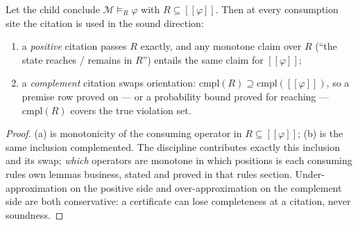 \begin{bprop}\label{prop:tc-consume}
Let the child conclude $\mathcal{M} \vDash_R \varphi$ with
$R \subseteq [\![\varphi]\!]$. Then at every consumption site the
citation is used in the sound direction:
\begin{enumerate}
\item[(a)] a \emph{positive} citation passes $R$ exactly, and any
  monotone claim over $R$ (``the state reaches / remains in $R$'')
  entails the same claim for $[\![\varphi]\!]$;
\item[(b)] a \emph{complement} citation swaps orientation:
  $\mathrm{cmpl}(R) \supseteq \mathrm{cmpl}([\![\varphi]\!])$, so a
  premise row proved on --- or a probability bound proved for reaching
  --- $\mathrm{cmpl}(R)$ covers the true violation set.
\end{enumerate}
\end{bprop}
\begin{proof}
(a) is monotonicity of the consuming operator in
$R \subseteq [\![\varphi]\!]$; (b) is the same inclusion complemented.
The discipline contributes exactly this inclusion and its swap;
\emph{which} operators are monotone in which positions is each
consuming rule\textquotesingle s own lemma\textquotesingle s business,
stated and proved in that rule\textquotesingle s section.
Under-approximation on the positive side and over-approximation on the
complement side are both conservative: a certificate can lose
completeness at a citation, never soundness.
\end{proof}

